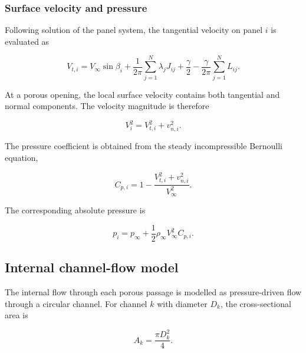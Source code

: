 \documentclass[a4paper,fleqn]{cas-dc}
\begin{document}
\subsubsection{Surface velocity and pressure}

Following solution of the panel system, the tangential velocity on
panel $i$ is evaluated as

\begin{equation}
	V_{t,i}
	=
	V_{\infty}\sin\beta_i
	+
	\frac{1}{2\pi}
	\sum_{j=1}^{N}\lambda_jJ_{ij}
	+
	\frac{\gamma}{2}
	-
	\frac{\gamma}{2\pi}
	\sum_{j=1}^{N}L_{ij}.
	\label{eq:tangential_velocity}
\end{equation}

At a porous opening, the local surface velocity contains both
tangential and normal components. The velocity magnitude is therefore

\begin{equation}
	V_i^2
	=
	V_{t,i}^{2}
	+
	v_{n,i}^{2}.
	\label{eq:surface_velocity_magnitude}
\end{equation}

The pressure coefficient is obtained from the steady incompressible
Bernoulli equation,

\begin{equation}
	C_{p,i}
	=
	1-
	\frac{
		V_{t,i}^{2}
		+
		v_{n,i}^{2}}
	{V_{\infty}^{2}}.
	\label{eq:pressure_coefficient}
\end{equation}

The corresponding absolute pressure is

\begin{equation}
	p_i
	=
	p_{\infty}
	+
	\frac{1}{2}
	\rho_{\infty}
	V_{\infty}^{2}
	C_{p,i}.
	\label{eq:absolute_pressure}
\end{equation}



\subsection{Internal channel-flow model}
\label{subsec:internal_channel_flow}

The internal flow through each porous passage is modelled as
pressure-driven flow through a circular channel. For channel $k$ with
diameter $D_k$, the cross-sectional area is

\begin{equation}
	A_k
	=
	\frac{\pi D_k^2}{4}.
	\label{eq:channel_area}
\end{equation}
\end{document}
